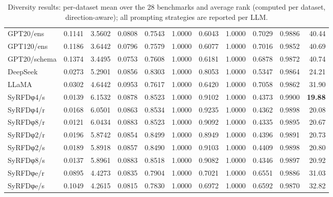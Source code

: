 \begin{table}[t]
\begin{tabular}{lrrrrrrrrrr}
GPT20/ens & 0.1141 & 3.5602 & 0.0808 & 0.7543 & 1.0000 & 0.6043 & 1.0000 & 0.7029 & 0.9886 & 40.44 \\
GPT120/ens & 0.1186 & 3.6442 & 0.0796 & 0.7579 & 1.0000 & 0.6077 & 1.0000 & 0.7016 & 0.9852 & 40.69 \\
GPT20/schema & 0.1374 & 3.4495 & 0.0753 & 0.7608 & 1.0000 & 0.6181 & 1.0000 & 0.6878 & 0.9872 & 40.74 \\
\midrule
DeepSeek & 0.0273 & 5.2901 & 0.0856 & 0.8303 & 1.0000 & 0.8053 & 1.0000 & 0.5347 & 0.9864 & 24.21 \\
LLaMA & 0.0302 & 4.6442 & 0.0953 & 0.7617 & 1.0000 & 0.6420 & 1.0000 & 0.7058 & 0.9862 & 31.90 \\
\midrule
SyRFDφ4/s & 0.0139 & 6.1532 & 0.0878 & 0.8523 & 1.0000 & 0.9102 & 1.0000 & 0.4373 & 0.9900 & \textbf{19.88} \\
SyRFDφ4/r & 0.0168 & 6.0501 & 0.0863 & 0.8534 & 1.0000 & 0.9235 & 1.0000 & 0.4362 & 0.9898 & 20.08 \\
SyRFDφ8/r & 0.0121 & 6.0434 & 0.0883 & 0.8523 & 1.0000 & 0.9092 & 1.0000 & 0.4335 & 0.9895 & 20.67 \\
SyRFDφ2/r & 0.0196 & 5.8742 & 0.0854 & 0.8499 & 1.0000 & 0.8949 & 1.0000 & 0.4396 & 0.9891 & 20.73 \\
SyRFDφ2/s & 0.0189 & 5.8918 & 0.0857 & 0.8490 & 1.0000 & 0.9103 & 1.0000 & 0.4409 & 0.9898 & 20.80 \\
SyRFDφ8/s & 0.0137 & 5.8961 & 0.0883 & 0.8518 & 1.0000 & 0.9082 & 1.0000 & 0.4346 & 0.9897 & 20.92 \\
SyRFDφe/r & 0.0895 & 4.4273 & 0.0835 & 0.7904 & 1.0000 & 0.7021 & 1.0000 & 0.6551 & 0.9886 & 31.03 \\
SyRFDφe/s & 0.1049 & 4.2615 & 0.0815 & 0.7830 & 1.0000 & 0.6972 & 1.0000 & 0.6592 & 0.9870 & 32.82 \\
\bottomrule
\end{tabular}
\caption{Diversity results: per-dataset mean over the 28 benchmarks and average rank (computed per dataset, direction-aware); all prompting strategies are reported per LLM.}
\label{tab:diversity_main}
\end{table}